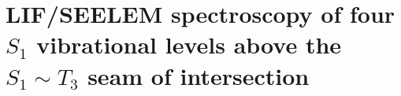 \documentclass[12pt]{mitthesis}
\newcommand{\rcm}{cm$^{-1}$}
\newcommand{\e}[1]{\ensuremath{\times 10^{#1}}}
\newcommand{\degrees}{\ensuremath{^\circ}}
\begin{document}



\section{LIF/SEELEM spectroscopy of four $S_1$ vibrational levels above
  the $S_1 \sim T_3$ seam of intersection}

\end{document}
